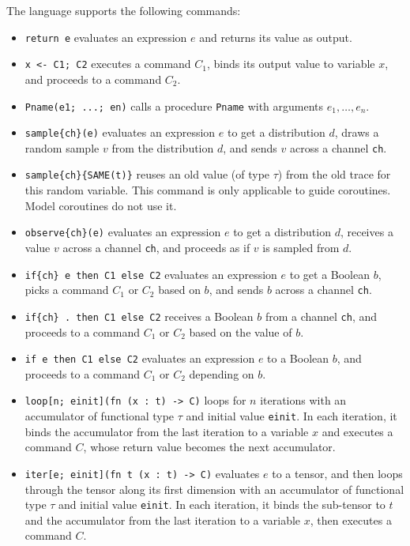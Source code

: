 The language supports the following commands:
\begin{itemize}
  \item \texttt{return e} evaluates an expression $e$ and returns its value as
        output.
  \item \texttt{x <- C1; C2} executes a command $C_1$, binds its output value to
        variable $x$, and proceeds to a command $C_2$.
  \item \texttt{Pname(e1; ...; en)} calls a procedure \texttt{Pname} with
        arguments $e_1, \ldots, e_n$.
  \item \verb$sample{ch}(e)$ evaluates an expression $e$ to get a distribution
        $d$, draws a random sample $v$ from the distribution $d$, and sends $v$
        across a channel \texttt{ch}.
  \item \verb$sample{ch}{SAME(t)}$ reuses an old value (of type $\tau$) from the
        old trace for this random variable.
        This command is only applicable to guide coroutines.
        Model coroutines do not use it.
  \item \verb$observe{ch}(e)$ evaluates an expression $e$ to get a distribution
        $d$, receives a value $v$ across a channel \texttt{ch}, and proceeds as
        if $v$ is sampled from $d$.
  \item \verb$if{ch} e then C1 else C2$ evaluates an expression $e$ to get a
        Boolean $b$, picks a command $C_1$ or $C_2$ based on $b$, and sends $b$
        across a channel \texttt{ch}.
  \item \verb$if{ch} . then C1 else C2$ receives a Boolean $b$ from a channel
        \texttt{ch}, and proceeds to a command $C_1$ or $C_2$ based on the value
        of $b$.
  \item \texttt{if e then C1 else C2} evaluates an expression $e$ to a Boolean
        $b$, and proceeds to a command $C_1$ or $C_2$ depending on $b$.
  \item \texttt{loop[n; einit](fn (x : t) -> C)} loops for $n$ iterations with
        an accumulator of functional type $\tau$ and initial value
        \texttt{einit}.
        In each iteration, it binds the accumulator from the last iteration to a
        variable $x$ and executes a command $C$, whose return value becomes the
        next accumulator.
  \item \texttt{iter[e; einit](fn t (x : t) -> C)} evaluates $e$ to a tensor,
        and then loops through the tensor along its first dimension with an
        accumulator of functional type $\tau$ and initial value \texttt{einit}.
        In each iteration, it binds the sub-tensor to $t$ and the accumulator
        from the last iteration to a variable $x$, then executes a command $C$.
\end{itemize}

